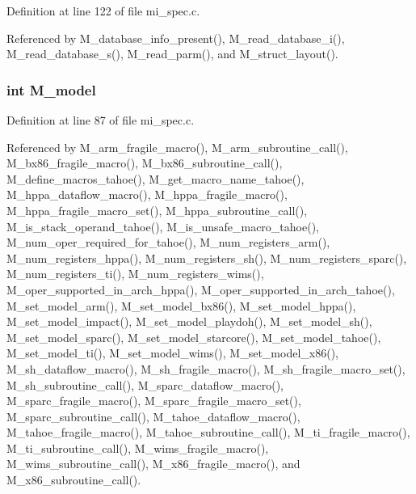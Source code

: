 Definition at line 122 of file mi\_\-spec.c.

Referenced by M\_\-database\_\-info\_\-present(), M\_\-read\_\-database\_\-i(), M\_\-read\_\-database\_\-s(), M\_\-read\_\-parm(), and M\_\-struct\_\-layout().
\subsubsection{\setlength{\rightskip}{0pt plus 5cm}int \bf{M\_\-model}}\label{m__spec_8h_0ff76fcfde2c71e202ea12dd9410bf65}




Definition at line 87 of file mi\_\-spec.c.

Referenced by M\_\-arm\_\-fragile\_\-macro(), M\_\-arm\_\-subroutine\_\-call(), M\_\-bx86\_\-fragile\_\-macro(), M\_\-bx86\_\-subroutine\_\-call(), M\_\-define\_\-macros\_\-tahoe(), M\_\-get\_\-macro\_\-name\_\-tahoe(), M\_\-hppa\_\-dataflow\_\-macro(), M\_\-hppa\_\-fragile\_\-macro(), M\_\-hppa\_\-fragile\_\-macro\_\-set(), M\_\-hppa\_\-subroutine\_\-call(), M\_\-is\_\-stack\_\-operand\_\-tahoe(), M\_\-is\_\-unsafe\_\-macro\_\-tahoe(), M\_\-num\_\-oper\_\-required\_\-for\_\-tahoe(), M\_\-num\_\-registers\_\-arm(), M\_\-num\_\-registers\_\-hppa(), M\_\-num\_\-registers\_\-sh(), M\_\-num\_\-registers\_\-sparc(), M\_\-num\_\-registers\_\-ti(), M\_\-num\_\-registers\_\-wims(), M\_\-oper\_\-supported\_\-in\_\-arch\_\-hppa(), M\_\-oper\_\-supported\_\-in\_\-arch\_\-tahoe(), M\_\-set\_\-model\_\-arm(), M\_\-set\_\-model\_\-bx86(), M\_\-set\_\-model\_\-hppa(), M\_\-set\_\-model\_\-impact(), M\_\-set\_\-model\_\-playdoh(), M\_\-set\_\-model\_\-sh(), M\_\-set\_\-model\_\-sparc(), M\_\-set\_\-model\_\-starcore(), M\_\-set\_\-model\_\-tahoe(), M\_\-set\_\-model\_\-ti(), M\_\-set\_\-model\_\-wims(), M\_\-set\_\-model\_\-x86(), M\_\-sh\_\-dataflow\_\-macro(), M\_\-sh\_\-fragile\_\-macro(), M\_\-sh\_\-fragile\_\-macro\_\-set(), M\_\-sh\_\-subroutine\_\-call(), M\_\-sparc\_\-dataflow\_\-macro(), M\_\-sparc\_\-fragile\_\-macro(), M\_\-sparc\_\-fragile\_\-macro\_\-set(), M\_\-sparc\_\-subroutine\_\-call(), M\_\-tahoe\_\-dataflow\_\-macro(), M\_\-tahoe\_\-fragile\_\-macro(), M\_\-tahoe\_\-subroutine\_\-call(), M\_\-ti\_\-fragile\_\-macro(), M\_\-ti\_\-subroutine\_\-call(), M\_\-wims\_\-fragile\_\-macro(), M\_\-wims\_\-subroutine\_\-call(), M\_\-x86\_\-fragile\_\-macro(), and M\_\-x86\_\-subroutine\_\-call().

